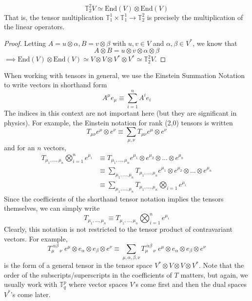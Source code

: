 \documentclass{article}
\begin{document}
    \begin{proposition}
    \[\mathbb{T}^2_2 V \simeq \text{End}(V) \otimes \text{End}(V)\]
    That is, the tensor multiplication $\mathbb{T}^1_1 \times \mathbb{T}^1_1 \longrightarrow \mathbb{T}^2_2$ is precisely the multiplication of the linear operators. 
    \end{proposition}
    \begin{proof}
    Letting $A = u \otimes \alpha, B = v \otimes \beta$ with $u, v \in V$ and $\alpha, \beta \in V^*$, we know that
    \[A \otimes B = u \otimes v \otimes \alpha \otimes \beta\]
    $\implies \text{End}(V) \otimes \text{End}(V) \simeq V \otimes V \otimes V^* \otimes V^* \simeq \mathbb{T}^2_2 V$. 
    \end{proof}

    When working with tensors in general, we use the Einstein Summation Notation to write vectors in shorthand form
    \[ A^{\mu} e_{\mu} \equiv \sum_{i=1}^{n} A^{i} e_{i}\]
    The indices in this context are not important here (but they are significant in physics). For example, the Einstein notation for rank (2,0) tensors is written
    \[ T_{\mu \nu} e^{\mu} \otimes e^{\nu} \equiv \sum_{\mu, \nu} T_{\mu \nu} e^{\mu} \otimes e^{\nu}\]
    and for an $n$ vectors, 
    \begin{align*}
    T_{\mu_{1}, ..., \mu_{n}} \bigotimes_{i=1}^{n} e^{\mu_{i}} & \equiv T_{\mu_{1}, ..., \mu_{n}} e^{\mu_{1}} \otimes e^{\mu_{2}} \otimes ... \otimes e^{\mu_{n}} \\
         & \equiv \sum_{\mu_{1}, ..., \mu_{n}} T_{\mu_{1}, ..., \mu_{n}} e^{\mu_{1}} \otimes e^{\mu_{2}} \otimes ... \otimes e^{\mu_{n}} \\
         & \equiv \sum_{\mu_{1}, ..., \mu_{n}} T_{\mu_{1}, ..., \mu_{n}} \bigotimes_{i=1} e^{\mu_{i}}
    \end{align*}
    Since the coefficients of the shorthand tensor notation implies the tensors themselves, we can simply write
    \[ T_{\mu_{1}, ..., \mu_{n}} \equiv T_{\mu_{1}, ..., \mu_{n}} \bigotimes_{i=1}^{n} e^{\mu_{i}} \]
    Clearly, this notation is not restricted to the tensor product of contravariant vectors. For example,
    \[T_{\mu \;\;\;\;\nu}^{\; \alpha \beta} \; e^{\mu} \otimes e_{\alpha} \otimes e_{\beta} \otimes e^{\nu}  \equiv \sum_{\mu, \alpha, \beta, \nu} T_{\mu \;\;\;\; \nu}^{\; \alpha \beta} \; e^{\mu} \otimes e_{\alpha} \otimes e_{\beta} \otimes e^{\nu}\]
    is the form of a general tensor in the tensor space $V^* \otimes V \otimes V \otimes V^*$. Note that the order of the subscripts/superscripts in the coefficients of $T$ matters, but again, we usually work with $\mathbb{T}^p_q$ where vector spaces $V$'s come first and then the dual spaces $V^*$'s come later. 
\end{document}
